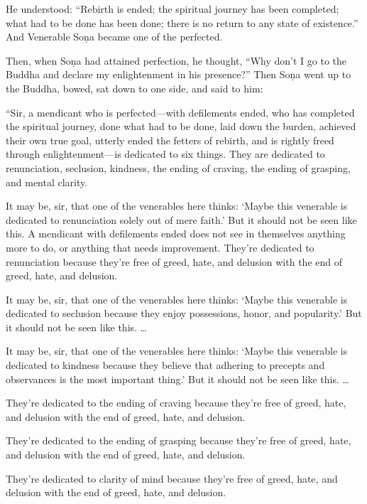 \documentclass[12pt,openany]{book}%
\begin{document}
He understood: “Rebirth is ended; the spiritual journey has been completed; what had to be done has been done; there is no return to any state of existence.” And Venerable \textsanskrit{Soṇa} became one of the perfected. 

Then, when \textsanskrit{Soṇa} had attained perfection, he thought, “Why don’t I go to the Buddha and declare my enlightenment in his presence?” Then \textsanskrit{Soṇa} went up to the Buddha, bowed, sat down to one side, and said to him: 

“Sir, a mendicant who is perfected—with defilements ended, who has completed the spiritual journey, done what had to be done, laid down the burden, achieved their own true goal, utterly ended the fetters of rebirth, and is rightly freed through enlightenment—is dedicated to six things. They are dedicated to renunciation, seclusion, kindness, the ending of craving, the ending of grasping, and mental clarity. 

It may be, sir, that one of the venerables here thinks: ‘Maybe this venerable is dedicated to renunciation solely out of mere faith.’ But it should not be seen like this. A mendicant with defilements ended does not see in themselves anything more to do, or anything that needs improvement. They’re dedicated to renunciation because they’re free of greed, hate, and delusion with the end of greed, hate, and delusion. 

It may be, sir, that one of the venerables here thinks: ‘Maybe this venerable is dedicated to seclusion because they enjoy possessions, honor, and popularity.’ But it should not be seen like this. … 

It may be, sir, that one of the venerables here thinks: ‘Maybe this venerable is dedicated to kindness because they believe that adhering to precepts and observances is the most important thing.’ But it should not be seen like this. … 

They’re dedicated to the ending of craving because they’re free of greed, hate, and delusion with the end of greed, hate, and delusion. 

They’re dedicated to the ending of grasping because they’re free of greed, hate, and delusion with the end of greed, hate, and delusion. 

They’re dedicated to clarity of mind because they’re free of greed, hate, and delusion with the end of greed, hate, and delusion. 
\end{document}
